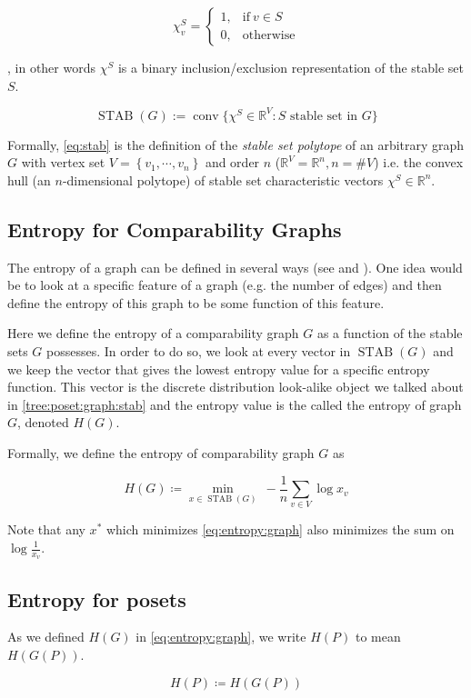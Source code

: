 $$ \chi^S_v =\begin{cases}
      1, & \text{if}\ v \in S\\
      0, & \text{otherwise}
    \end{cases}$$


, in other words $\chi^S$ is a binary inclusion/exclusion representation of the stable set $S$.

\begin{equation}
\operatorname{STAB}(G) := \operatorname{conv}\{\chi^S \in \mathbb{R}^V : S\text{ stable set in }G\}
\label{eq:stab}
\end{equation}

Formally, \ref{eq:stab} is the definition of the \emph{stable set polytope} of an arbitrary graph $G$ with vertex set $V = \left\{{v_1, \cdots, v_n }\right\}$ and order $n$ ($\mathbb{R}^V = \mathbb{R}^n, n = \#V$) i.e. the convex hull (an $n$-dimensional polytope) of stable set characteristic vectors $\chi^S \in \mathbb{R}^n$.



\subsection{Entropy for Comparability Graphs}

The entropy of a graph can be defined in several ways (see \cite{mowshowitz2012entropy} and \cite{simonyi1995graph}). One idea would be to look at a specific feature of a graph (e.g. the number of edges) and then define the entropy of this graph to be some function of this feature.

Here we define the entropy of a comparability graph $G$ as a function of the stable sets $G$ possesses. In order to do so, we look at every vector in $\operatorname{STAB}(G)$ and we keep the vector that gives the lowest entropy value for a specific entropy function. This vector is the discrete distribution look-alike object we talked about in \ref{tree:poset:graph:stab} and the entropy value is the called the entropy of graph $G$, denoted ${H}(G)$.

Formally, we define the entropy of comparability graph $G$ as

\begin{equation}
{H}(G) \coloneqq \min_{x \in \operatorname{STAB}(G)}~ -\frac{1}{n} \sum_{v \in V} \log x_v
\label{eq:entropy:graph}
\end{equation}

Note that any $x^*$ which minimizes \ref{eq:entropy:graph} also minimizes the sum on $\log \frac{1}{x_v}$.



\subsection{Entropy for posets}


As we defined ${H}(G)$ in \ref{eq:entropy:graph}, we write ${H}(P)$ to mean ${H}(G(P))$.

\begin{equation}
{H}(P) \coloneqq {H}({G}(P))
\label{eq:entropy:poset}
\end{equation}
